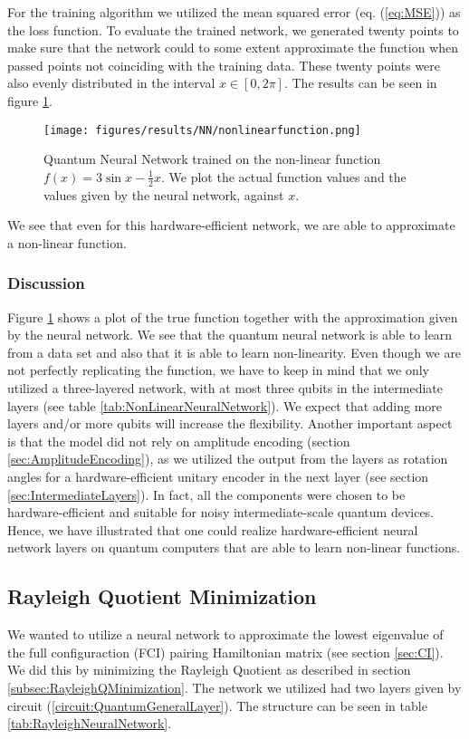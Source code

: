 For the training algorithm we utilized the mean squared error (eq. (\ref{eq:MSE})) as the loss function. To evaluate the trained network, we generated twenty points to make sure that the network could to some extent approximate the function when passed points not coinciding with the training data. These twenty points were also evenly distributed in the interval $x \in [0,2\pi]$. The results can be seen in figure \ref{fig:NNNonLinearFunction}.
\begin{figure}[H]
    \centering
    \texttt{[image: figures/results/NN/nonlinearfunction.png]}
    \caption{Quantum Neural Network trained on the non-linear function $f(x) = 3 \sin{x} - \frac{1}{2}x$. We plot the actual function values and the values given by the neural network, against $x$.}
    \label{fig:NNNonLinearFunction}
\end{figure}
We see that even for this hardware-efficient network, we are able to approximate a non-linear function.

\subsubsection{Discussion}
Figure \ref{fig:NNNonLinearFunction} shows a plot of the true function together with the approximation given by the neural network. We see that the quantum neural network is able to learn from a data set and also that it is able to learn non-linearity. Even though we are not perfectly replicating the function, we have to keep in mind that we only utilized a three-layered network, with at most three qubits in the intermediate layers (see table \ref{tab:NonLinearNeuralNetwork}). We expect that adding more layers and/or more qubits will increase the flexibility. Another important aspect is that the model did not rely on amplitude encoding (section \ref{sec:AmplitudeEncoding}), as we utilized the output from the layers as rotation angles for a hardware-efficient unitary encoder in the next layer (see section \ref{sec:IntermediateLayers}). In fact, all the components were chosen to be hardware-efficient and suitable for noisy intermediate-scale quantum devices. Hence, we have illustrated that one could realize hardware-efficient neural network layers on quantum computers that are able to learn non-linear functions.


\subsection{Rayleigh Quotient Minimization}
\label{subsec:ResRayleighMin}
We wanted to utilize a neural network to approximate the lowest eigenvalue of the full configuraction (FCI) pairing Hamiltonian matrix (see section \ref{sec:CI}). We did this by minimizing the Rayleigh Quotient as described in section \ref{subsec:RayleighQMinimization}. The network we utilized had two layers given by circuit (\ref{circuit:QuantumGeneralLayer}). The structure can be seen in table \ref{tab:RayleighNeuralNetwork}.

